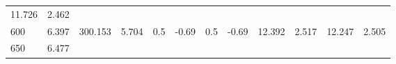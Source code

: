 \documentclass{article}
\begin{document}
\begin{longtable}[]{@{}llllllllllll@{}}
\begin{minipage}[t]{0.06\columnwidth}
11.726\strut
\end{minipage} & \begin{minipage}[t]{0.09\columnwidth}\raggedright\strut
2.462\strut
\end{minipage}\tabularnewline
\begin{minipage}[t]{0.03\columnwidth}\raggedright\strut
600\strut
\end{minipage} & \begin{minipage}[t]{0.06\columnwidth}\raggedright\strut
6.397\strut
\end{minipage} & \begin{minipage}[t]{0.06\columnwidth}\raggedright\strut
300.153\strut
\end{minipage} & \begin{minipage}[t]{0.08\columnwidth}\raggedright\strut
5.704\strut
\end{minipage} & \begin{minipage}[t]{0.03\columnwidth}\raggedright\strut
0.5\strut
\end{minipage} & \begin{minipage}[t]{0.06\columnwidth}\raggedright\strut
-0.69\strut
\end{minipage} & \begin{minipage}[t]{0.03\columnwidth}\raggedright\strut
0.5\strut
\end{minipage} & \begin{minipage}[t]{0.06\columnwidth}\raggedright\strut
-0.69\strut
\end{minipage} & \begin{minipage}[t]{0.06\columnwidth}\raggedright\strut
12.392\strut
\end{minipage} & \begin{minipage}[t]{0.08\columnwidth}\raggedright\strut
2.517\strut
\end{minipage} & \begin{minipage}[t]{0.06\columnwidth}\raggedright\strut
12.247\strut
\end{minipage} & \begin{minipage}[t]{0.09\columnwidth}\raggedright\strut
2.505\strut
\end{minipage}\tabularnewline
\begin{minipage}[t]{0.03\columnwidth}\raggedright\strut
650\strut
\end{minipage} & \begin{minipage}[t]{0.06\columnwidth}\raggedright\strut
6.477\strut
\end{minipage} & \begin{minipage}[t]{0.06\columnwidth}\raggedright\strut

\end{minipage}
\end{longtable}
\end{document}
